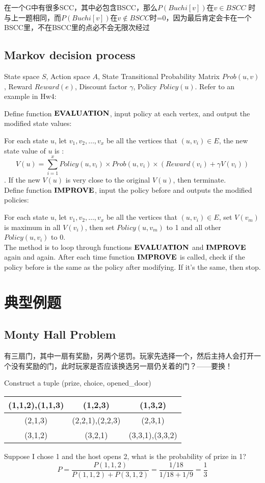 \documentclass[12pt,a4paper]{ctexrep}
\begin{document}
在一个G中有很多SCC，其中必包含BSCC，那么$P(Buchi[v])$在$v\in BSCC$ 时与上一题相同，而$P(Buchi[v])$在$v \notin BSCC$时=0，因为最后肯定会卡在一个BSCC里，不在BSCC里的点必不会无限次经过

\subsection{Markov decision process}
State space $S$, Action space $A$, State Transitional Probability Matrix $Prob(u,v)$, Reward $Reward(e)$, Discount factor $\gamma$, Policy $Policy(u)$. Refer to an example in Hw4: 

Define function $\bold{EVALUATION}$, input policy at each vertex, and output the modified state values:

For each state $u$, let $v_1,v_2,\dots, v_x$ be all the vertices that $(u,v_i)\in E$, the new state value of $u$ is :\[V(u)=\sum_{i=1}^{x} Policy(u,v_i)\times Prob(u,v_i)\times (Reward(v_i)+\gamma V(v_i))\]. If the new $V(u)$ is very close to the original $V(u)$, then terminate.\\

Define function $\bold{IMPROVE}$, input the policy before and outputs the modified policies:

For each state $u$, let $v_1,v_2,\dots, v_x$ be all the vertices that $(u,v_i)\in E$, set $V(v_m)$ is maximum in all $V(v_i)$, then set $Policy(u,v_m)$ to 1 and all other $Policy(u,v_i)$ to 0. \\

The method is to loop through functions $\bold{EVALUATION}$ and $\bold{IMPROVE}$ again and again. After each time function $\bold{IMPROVE}$ is called, check if the policy before is the same as the policy after modifying. If it's the same, then stop.
\section{典型例题}
\subsection{Monty Hall Problem}
有三扇门，其中一扇有奖励，另两个惩罚。玩家先选择一个，然后主持人会打开一个没有奖励的门，此时玩家是否应该换选另一扇仍关着的门？——要换！

Construct a tuple (prize, choice, opened\_door)
\begin{center}
\begin{tabular}{|c|c|c|}
\hline
(1,1,2),(1,1,3) & (1,2,3) & (1,3,2)\\
\hline
(2,1,3) & (2,2,1),(2,2,3) & (2,3,1)\\
\hline
(3,1,2) & (3,2,1) & (3,3,1),(3,3,2)\\
\hline
\end{tabular}
\end{center}
Suppose I chose 1 and the host opens 2, what is the probability of prize in 1? \[P = \frac{P(1,1,2)}{P(1,1,2)+P(3,1,2)} = \frac{1/18}{1/18+1/9} = \frac{1}{3}\]
\end{document}
